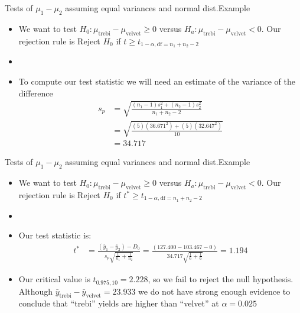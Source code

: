 \documentclass[xcolor=dvipsnames]{beamer}
\begin{document}
\begin{frame}{Tests of $\mu_1 - \mu_2$ assuming equal variances and normal dist.}{Example}
\begin{itemize}
	\item We want to test $H_0: \mu_{\text{trebi}} - \mu_{\text{velvet}} \geq 0$ versus $H_a: \mu_{\text{trebi}} - \mu_{\text{velvet}} < 0$. Our rejection rule is Reject $H_0$ if $t \geq t_{1-\alpha, \text{df} = n_1 + n_2 -2}$
	\item[]
	\item To compute our test statistic we will need an estimate of the variance of the difference
	\begin{align*}
		s_p &= \sqrt{\frac{(n_1 -1)s_1^2 + (n_2-1)s_2^2}{n_1 + n_2 -2}} \\
		&= \sqrt{\frac{(5)(36.671^2) + (5)(32.647^2)}{10}} \\
		&= 34.717
	\end{align*}
\end{itemize}
\end{frame}

\begin{frame}{Tests of $\mu_1 - \mu_2$ assuming equal variances and normal dist.}{Example}
\begin{itemize}
	\item We want to test $H_0: \mu_{\text{trebi}} - \mu_{\text{velvet}} \geq 0$ versus $H_a: \mu_{\text{trebi}} - \mu_{\text{velvet}} < 0$. Our rejection rule is Reject $H_0$ if $t^* \geq t_{1-\alpha, \text{df} = n_1 + n_2 -2}$
	\item[]
	\item Our test statistic is:
	\begin{align*}
	t^* &= \frac{(\bar{y}_1-\bar{y}_2) - D_0}{s_p \sqrt{\frac{1}{n_1} + \frac{1}{n_2}}} = \frac{(127.400 - 103.467 - 0)}{34.717 \sqrt{\frac{1}{6}+\frac{1}{6}}} = 1.194
	\end{align*}
	\item Our critical value is $t_{0.975,10} = 2.228$, so we fail to reject the null hypothesis. Although $\bar{y}_{\text{trebi}} - \bar{y}_{\text{velvet}} = 23.933$ we do not have strong enough evidence to conclude that ``trebi'' yields are higher than ``velvet'' at $\alpha = 0.025$
\end{itemize}
\end{frame}
\end{document}
